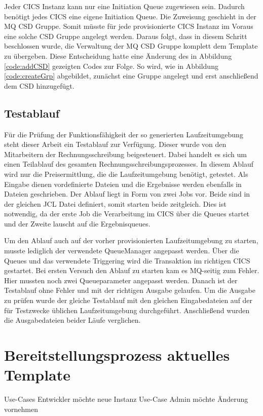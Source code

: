 Jeder CICS Instanz kann nur eine Initiation Queue zugewiesen sein.
Dadurch benötigt jedes CICS eine eigene Initiation Queue.
Die Zuweisung geschieht in der MQ CSD Gruppe.
Somit müsste für jede provisionierte CICS Instanz im Voraus eine solche CSD Gruppe angelegt werden.
Daraus folgt, dass in diesem Schritt beschlossen wurde, die Verwaltung der MQ CSD Gruppe komplett dem Template zu übergeben.
Diese Entscheidung hatte eine Änderung des in Abbildung \ref{code:addCSD} gezeigten Codes zur Folge.
So wird, wie in Abbildung \ref{code:createGrp} abgebildet, zunächst eine Gruppe angelegt und erst anschließend dem CSD hinzugefügt.

\subsection{Testablauf}
Für die Prüfung der Funktionsfähigkeit der so generierten Laufzeitumgebung steht dieser Arbeit ein Testablauf zur Verfügung.
Dieser wurde von den Mitarbeitern der Rechnungsschreibung beigesteuert.
Dabei handelt es sich um einen Teilablauf des gesamten Rechnungsschreibungsprozesses.
In diesem Ablauf wird nur die Preisermittlung, die die Laufzeitumgebung benötigt, getestet.
Als Eingabe dienen vordefinierte Dateien und die Ergebnisse werden ebenfalls in Dateien geschrieben.
Der Ablauf liegt in Form von zwei Jobs vor.
Beide sind in der gleichen JCL Datei definiert, somit starten beide zeitgleich.
Dies ist notwendig, da der erste Job die Verarbeitung im CICS über die Queues startet und der Zweite lauscht auf die Ergebnisqueues.

Um den Ablauf auch auf der vorher provisionierten Laufzeitumgebung zu starten, musste lediglich der verwendete QueueManager angepasst werden.
Über die Queues und das verwendete Triggering wird die Transaktion im richtigen CICS gestartet.
Bei ersten Versuch den Ablauf zu starten kam es MQ-seitig zum Fehler.
Hier mussten noch zwei Queueparameter angepasst werden.
Danach ist der Testablauf ohne Fehler und mit der richtigen Ausgabe gelaufen.
Um die Ausgabe zu prüfen wurde der gleiche Testablauf mit den gleichen Eingabedateien auf der für Testzwecke üblichen Laufzeitumgebung durchgeführt.
Anschließend wurden die Ausgabedateien beider Läufe verglichen.

\section{Bereitstellungsprozess aktuelles Template}
Use-Cases Entwickler möchte neue Instanz
Use-Case Admin möchte Änderung vornehmen

